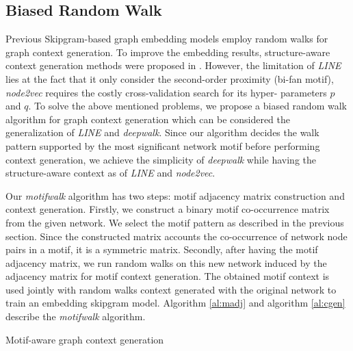 \documentclass{article}
\theoremstyle{definition}
\begin{document}
\subsection{Biased Random Walk}

Previous Skipgram-based graph embedding models employ random
walks for graph context generation. To improve the embedding results,
structure-aware context generation methods were proposed in 
\cite{line,node2vec}. However, the limitation of \emph{LINE} lies at the 
fact that it only consider the second-order proximity (bi-fan motif),  
\emph{node2vec} requires the costly cross-validation search for its hyper-
parameters $p$ and $q$. To solve the above mentioned problems, we propose 
a biased random walk algorithm for graph context generation which can be 
considered the generalization of \emph{LINE} and \emph{deepwalk}. Since 
our algorithm decides the walk pattern supported by the most significant 
network motif before performing context generation, we achieve the 
simplicity of \emph{deepwalk} while having the structure-aware context as 
of \emph{LINE} and \emph{node2vec}.

Our \emph{motifwalk} algorithm has two steps: motif adjacency matrix
construction and context generation. Firstly, we construct a binary
motif co-occurrence matrix from the given network. We select the motif
pattern as described in the previous section. Since the constructed matrix 
accounts the co-occurrence of network node pairs in a motif, it is a 
symmetric matrix. Secondly, after having the motif adjacency matrix, 
we run random walks on this new network induced by the adjacency matrix
for motif context generation. The obtained motif context is used jointly 
with random walks context generated with the original network to train an 
embedding skipgram model. Algorithm \ref{al:madj} and algorithm 
\ref{al:cgen} describe the \emph{motifwalk} algorithm.
\begin{algorithm}[h] \label{al:cgen}
\caption{Motif-aware graph context generation}
\end{algorithm}
\end{document}
